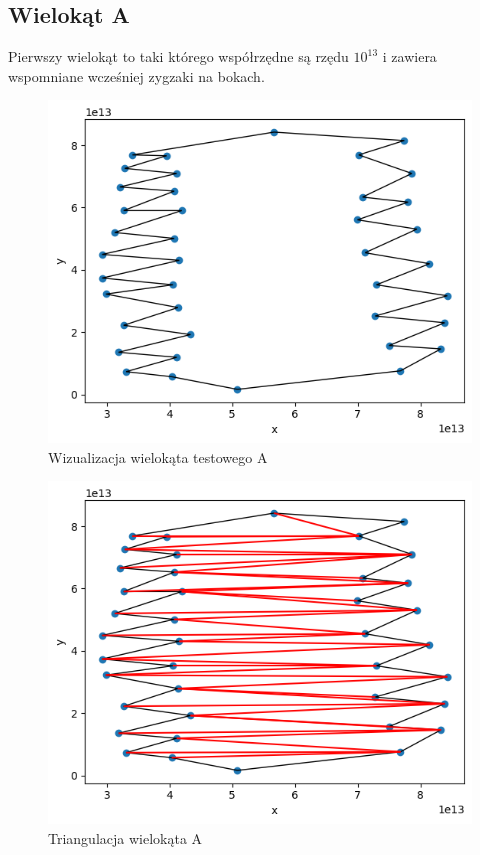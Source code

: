 \documentclass[a4paper]{article}
\begin{document}
    \subsection{Wielokąt A}
    Pierwszy wielokąt to taki którego współrzędne są rzędu $10^{13}$ i zawiera wspomniane wcześniej
    zygzaki na bokach.
    \begin{figure}[H]
        \centering
        \includegraphics[width=.65\textwidth]{test_a_poly.png}
        \caption{Wizualizacja wielokąta testowego A}
        \label{fig:test_a_poly}
    \end{figure}
    \begin{figure}[H]
        \centering
        \includegraphics[width=.65\textwidth]{test_a_tri.png}
        \caption{Triangulacja wielokąta A}
        \label{fig:test_a_tri}
    \end{figure}
\end{document}
